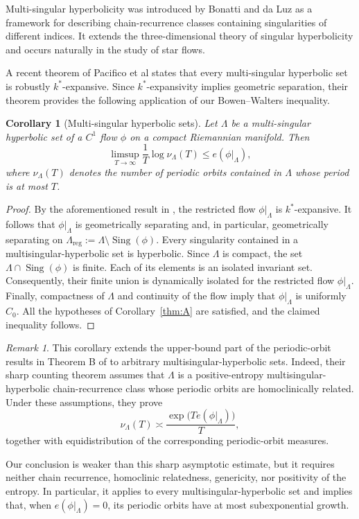 \documentclass[11pt,reqno]{amsart}
\newtheorem{corollary}[theorem]{Corollary}
\theoremstyle{definition}
\theoremstyle{remark}
\newtheorem{remark}[theorem]{Remark}
\newcommand{\Sing}{\operatorname{Sing}}
\begin{document}
Multi-singular hyperbolicity was introduced by Bonatti and da Luz
\cite{bdl} as a framework for describing chain-recurrence classes
containing singularities of different indices. It extends the
three-dimensional theory of singular hyperbolicity and occurs naturally
in the study of star flows.

A recent theorem of Pacifico et al \cite{pyyz} states
that every multi-singular hyperbolic set is robustly $k^*$-expansive. Since $k^*$-expansivity implies geometric
separation, their theorem provides the following application of our
Bowen--Walters inequality.

\begin{corollary}[Multi-singular hyperbolic sets]
\label{cor:multisingular}
Let $\Lambda$ be a multi-singular hyperbolic set of a $C^1$ flow $\phi$ on a compact Riemannian manifold. Then
\[
\limsup_{T\to\infty}
\frac{1}{T}\log\nu_\Lambda(T)
\leq e(\phi|_\Lambda),
\]
where $\nu_\Lambda(T)$ denotes the number of periodic orbits contained
in $\Lambda$ whose period is at most $T$.
\end{corollary}

\begin{proof}
By the aforementioned result in
\cite{pyyz}, the restricted flow $\phi|_\Lambda$ is $k^*$-expansive. It follows that $\phi|_\Lambda$ is geometrically
separating and, in particular, geometrically separating on
$
\Lambda_{\mathrm{reg}}
:=
\Lambda\setminus\Sing(\phi).
$
Every singularity contained in a multisingular-hyperbolic set is hyperbolic. Since $\Lambda$ is compact, the set
$
\Lambda\cap\Sing(\phi)
$
is finite. Each of its elements is an isolated invariant set.
Consequently, their finite union is dynamically isolated for the
restricted flow $\phi|_\Lambda$.
Finally, compactness of $\Lambda$ and continuity of the flow imply that $\phi|_\Lambda$ is uniformly $C_0$. All the hypotheses of
Corollary~\ref{thm:A} are satisfied, and the claimed
inequality follows.
\end{proof}


\begin{remark}
This corollary extends the upper-bound part of
the periodic-orbit results in Theorem B of
\cite{pyyz} to arbitrary multisingular-hyperbolic sets. Indeed, their
sharp counting theorem assumes that $\Lambda$ is a positive-entropy
multisingular-hyperbolic chain-recurrence class whose periodic orbits
are homoclinically related. Under these assumptions, they prove
\[
\nu_\Lambda(T)\asymp
\frac{\exp\bigl(T e(\phi|_\Lambda)\bigr)}{T},
\]
together with equidistribution of the corresponding periodic-orbit
measures.

Our conclusion is weaker than this sharp asymptotic estimate, but it
requires neither chain recurrence, homoclinic relatedness, genericity,
nor positivity of the entropy. In particular, it applies to every
multisingular-hyperbolic set and implies that, when
$e(\phi|_\Lambda)=0$, its periodic orbits have at most subexponential
growth.
\end{remark}
\end{document}
